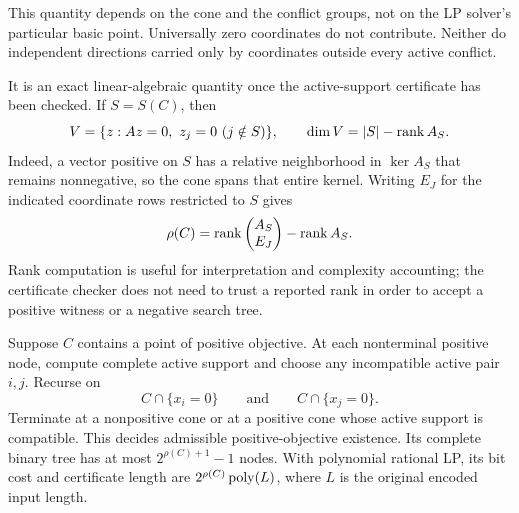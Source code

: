 This quantity depends on the cone and the conflict groups, not on the LP
solver's particular basic point.  Universally zero coordinates do not
contribute.  Neither do independent directions carried only by coordinates
outside every active conflict.

It is an exact linear-algebraic quantity once the active-support certificate
has been checked.  If $S=S(C)$, then
\begin{equation}\label{eq:active-dimension}
 V=\{z:Az=0,\ z_j=0\ (j\notin S)\},\qquad
 \dim V=|S|-\operatorname{rank} A_S.
\end{equation}
Indeed, a vector positive on $S$ has a relative neighborhood in
$\ker A_S$ that remains nonnegative, so the cone spans that entire kernel.
Writing $E_J$ for the indicated coordinate rows restricted to $S$ gives
\begin{equation}\label{eq:active-rho-rank}
 \rho(C)=\operatorname{rank}\begin{pmatrix}A_S\\E_J\end{pmatrix}-\operatorname{rank} A_S.
\end{equation}
Rank computation is useful for interpretation and complexity accounting; the
certificate checker does not need to trust a reported rank in order to accept
a positive witness or a negative search tree.

\begin{theorem}\label{thm:active-tree}
Suppose $C$ contains a point of positive objective.  At each nonterminal
positive node, compute complete active support and choose any incompatible
active pair $i,j$.  Recurse on
\[
 C\cap\{x_i=0\}\qquad\text{and}\qquad C\cap\{x_j=0\}.
\]
Terminate at a nonpositive cone or at a positive cone whose active support is
compatible.  This decides admissible positive-objective existence.  Its
complete binary tree has at most $2^{\rho(C)+1}-1$ nodes.  With polynomial
rational LP, its bit cost and certificate length are
$2^{\rho(C)}\operatorname{poly}(L)$, where $L$ is the original encoded input length.
\end{theorem}

